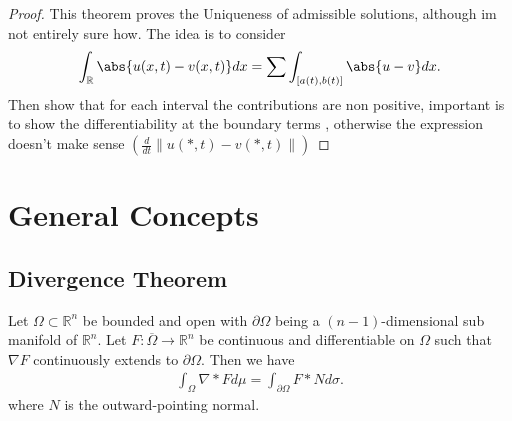 \begin{proof}
 This theorem proves the Uniqueness of admissible solutions, although im not entirely sure how. 
 The idea is to consider 
 \begin{align*}
   \int_\mathbb{R} \abs{u(x,t) - v(x,t)} dx = \sum \int_{[a(t),b(t)]} \abs{u-v} dx 
 .\end{align*}
 Then show that for each interval the contributions are non positive, 
 important is to show the differentiability at the boundary terms , otherwise the expression doesn't make sense $(\frac{d}{dt} \|u(*,t) - v(*,t)\|)$
\end{proof}
\chapter{General Concepts}
\section{Divergence Theorem}
\begin{Theorem}[2.7.]
 Let $\Omega  \subset \mathbb{R}^{n} $  be bounded and open with $\partial \Omega $ being a 
 $(n-1)$-dimensional sub manifold of $\mathbb{R}^{n} $. Let $F : \overline{\Omega } \to  \mathbb{R}^{n}  $ be continuous and differentiable
 on $\Omega $ such that $\nabla F$ continuously extends to $\partial \Omega $. Then we have 
 \begin{align*}
   \int_{\Omega } \nabla * F d\mu  = \int_{\partial \Omega } F*N d \sigma 
 .\end{align*}
 where $N$ is the outward-pointing normal.
\end{Theorem}
